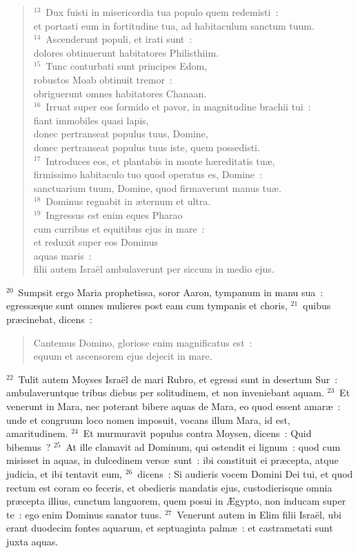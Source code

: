 \begin{verse}
${}^{13}$~Dux fuisti in misericordia tua populo quem redemisti~:\\ et portasti eum in fortitudine tua, ad habitaculum sanctum tuum.\\
${}^{14}$~Ascenderunt populi, et irati sunt~:\\ dolores obtinuerunt habitatores Philisthiim.\\
${}^{15}$~Tunc conturbati sunt principes Edom,\\ robustos Moab obtinuit tremor~:\\ obriguerunt omnes habitatores Chanaan.\\
${}^{16}$~Irruat super eos formido et pavor, in magnitudine brachii tui~:\\ fiant immobiles quasi lapis,\\ donec pertranseat populus tuus, Domine,\\ donec pertranseat populus tuus iste, quem possedisti.\\
${}^{17}$~Introduces eos, et plantabis in monte h\ae reditatis tu\ae ,\\ firmissimo habitaculo tuo quod operatus es, Domine~:\\ sanctuarium tuum, Domine, quod firmaverunt manus tu\ae .\\
${}^{18}$~Dominus regnabit in \ae ternum et ultra.\\
${}^{19}$~Ingressus est enim eques Pharao\\ cum curribus et equitibus ejus in mare~:\\ et reduxit super eos Dominus\\ aquas maris~:\\ filii autem Isra\"el ambulaverunt per siccum in medio ejus.\end{verse}


${}^{20}$~Sumpsit ergo Maria prophetissa, soror Aaron, tympanum in manu sua~: egress\ae que sunt omnes mulieres post eam cum tympanis et choris,
${}^{21}$~quibus pr\ae cinebat, dicens~: \begin{verse}Cantemus Domino, gloriose enim magnificatus est~:\\ equum et ascensorem ejus dejecit in mare.\end{verse}


${}^{22}$~Tulit autem Moyses Isra\"el de mari Rubro, et egressi sunt in desertum Sur~: ambulaveruntque tribus diebus per solitudinem, et non inveniebant aquam.
${}^{23}$~Et venerunt in Mara, nec poterant bibere aquas de Mara, eo quod essent amar\ae~: unde et congruum loco nomen imposuit, vocans illum Mara, id est, amaritudinem.
${}^{24}$~Et murmuravit populus contra Moysen, dicens~: Quid bibemus~?
${}^{25}$~At ille clamavit ad Dominum, qui ostendit ei lignum~: quod cum misisset in aquas, in dulcedinem vers\ae\ sunt~: ibi constituit ei pr\ae cepta, atque judicia, et ibi tentavit eum,
${}^{26}$~dicens~: Si audieris vocem Domini Dei tui, et quod rectum est coram eo feceris, et obedieris mandatis ejus, custodierisque omnia pr\ae cepta illius, cunctum languorem, quem posui in \AE gypto, non inducam super te~: ego enim Dominus sanator tuus.
${}^{27}$~Venerunt autem in Elim filii Isra\"el, ubi erant duodecim fontes aquarum, et septuaginta palm\ae~: et castrametati sunt juxta aquas.


